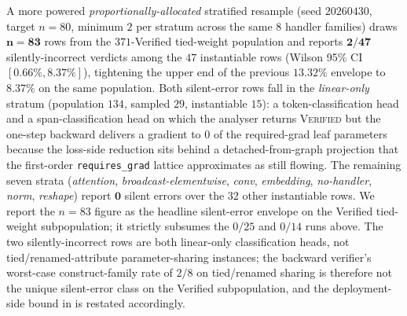 A more powered \emph{proportionally-allocated} stratified
resample (seed $20260430$, target $n{=}80$, minimum $2$ per
stratum across the same $8$ handler families) draws
$\mathbf{n{=}83}$ rows from the $371$-Verified
tied-weight population and reports
$\mathbf{2/47}$ silently-incorrect verdicts among the $47$
instantiable rows (Wilson 95\% CI
$\mathbf{[0.66\%, 8.37\%]}$), tightening the upper end of
the previous \mbox{$13.32\%$} envelope to $\mathbf{8.37\%}$
on the same population. Both silent-error rows fall in the
\emph{linear-only} stratum (population $134$, sampled $29$,
instantiable $15$): a token-classification head and a
span-classification head on which the analyser returns
\textsc{Verified} but the one-step backward delivers a
gradient to $0$ of the required-grad leaf parameters
because the loss-side reduction sits behind a
detached-from-graph projection that the first-order
\texttt{requires\_grad} lattice approximates as still
flowing. The remaining seven strata
(\textit{attention}, \textit{broadcast-elementwise},
\textit{conv}, \textit{embedding}, \textit{no-handler},
\textit{norm}, \textit{reshape}) report
$\mathbf{0}$ silent errors over the $32$ other instantiable
rows. We report the $n{=}83$ figure as the headline
silent-error envelope on the Verified tied-weight
subpopulation; it strictly subsumes the $0/25$ and
$0/14$ runs above. The two silently-incorrect rows are
both linear-only classification heads, not
tied/renamed-attribute parameter-sharing instances; the
backward verifier's worst-case construct-family rate of
$2/8$ on tied/renamed sharing is therefore not the unique
silent-error class on the Verified subpopulation, and the
deployment-side bound in  is restated
accordingly.
